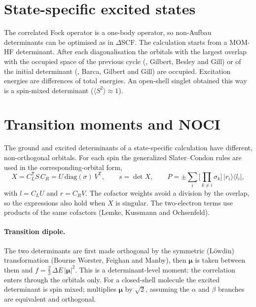 \section{State-specific excited states}
\label{sec:theory-mom}

The correlated Fock operator is a one-body operator, so non-Aufbau
determinants can be optimised as in $\Delta$SCF. The calculation starts from a
MOM-HF determinant. After each diagonalisation the orbitals with the largest
overlap with the occupied space of the previous cycle (, Gilbert,
Besley and Gill) or of the initial determinant (, Barca, Gilbert
and Gill) are occupied. Excitation energies are differences of total
energies. An open-shell singlet obtained this way is a spin-mixed determinant
($\langle S^2\rangle\approx 1$).

\section{Transition moments and NOCI}
\label{sec:theory-noci}

The ground and excited determinants of a state-specific calculation have
different, non-orthogonal orbitals. For each spin the generalized
Slater--Condon rules are used in the corresponding-orbital form,
\begin{equation}
  X = C_L^{\mathsf T} S\, C_R = U\,\mathrm{diag}(\sigma)\,V^{\mathsf T},\qquad
  s = \det X,\qquad
  P = \pm\sum_i \Big[\prod_{k\neq i}\sigma_k\Big]\,|r_i\rangle\langle l_i|,
\end{equation}
with $l=C_LU$ and $r=C_RV$. The cofactor weights avoid a division by the
overlap, so the expressions also hold when $X$ is singular. The two-electron
terms use products of the same cofactors (Lemke, Kussmann and Ochsenfeld).

\paragraph{Transition dipole.} The two determinants are first made orthogonal
by the symmetric (L\"owdin) transformation (Bourne Worster, Feighan and
Manby), then $\boldsymbol\mu$ is taken between them and
$f = \tfrac23\,\Delta E\,|\boldsymbol\mu|^2$. This is a determinant-level
moment: the correlation enters through the orbitals only. For a closed-shell
molecule the excited determinant is spin mixed; 
multiplies $\boldsymbol\mu$ by $\sqrt2$, assuming the $\alpha$ and $\beta$
branches are equivalent and orthogonal.

